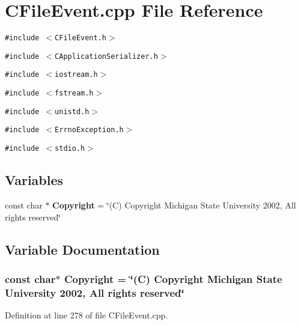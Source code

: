 \section{CFile\-Event.cpp File Reference}
\label{CFileEvent_8cpp}
{\tt \#include $<$CFile\-Event.h$>$}\par
{\tt \#include $<$CApplication\-Serializer.h$>$}\par
{\tt \#include $<$iostream.h$>$}\par
{\tt \#include $<$fstream.h$>$}\par
{\tt \#include $<$unistd.h$>$}\par
{\tt \#include $<$Errno\-Exception.h$>$}\par
{\tt \#include $<$stdio.h$>$}\par
\subsection*{Variables}
\begin{CompactItemize}
\item 
const char $\ast$ {\bf Copyright} = \char`\"{}(C) Copyright Michigan State University 2002, All rights reserved\char`\"{}
\end{CompactItemize}


\subsection{Variable Documentation}
\subsubsection{\setlength{\rightskip}{0pt plus 5cm}const char$\ast$ Copyright = \char`\"{}(C) Copyright Michigan State University 2002, All rights reserved\char`\"{}\hspace{0.3cm}{\tt  [static]}}\label{CFileEvent_8cpp_a0}




Definition at line 278 of file CFile\-Event.cpp.
